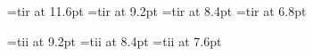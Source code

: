 








\font\twelverm=tir at 11.6pt
\font\ninerm=tir at 9.2pt
\font\eightrm=tir at 8.4pt
\font\sixrm=tir at 6.8pt	%

\font\nineit=tii at 9.2pt
\font\eightit=tii at 8.4pt	%
\font\sevenit=tii at 7.6pt	%

